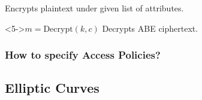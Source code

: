 \begin{frame}[c]
\begin{minipage}[t]{0.49\textwidth}
\begin{block}
            \centering
            Encrypts plaintext under given list of attributes.
        \end{block}
        \vspace{0.5cm}
        \begin{block}<5->{\centering $m = \text{Decrypt}(k, c)$}
            \centering
            Decrypts ABE ciphertext.
        \end{block}
    \end{minipage}
\end{frame}

\begin{frame}[c]
    \frametitle{How to specify Access Policies?}
    
\end{frame}

\subsection{Elliptic Curves}

